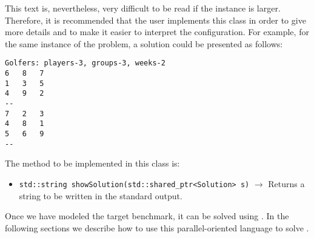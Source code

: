 This text is, nevertheless, very difficult to be read if the instance is larger. Therefore, it is recommended that the user implements this class in order to give more details and to make it easier to interpret the configuration. For example, for the same instance of the problem, a solution could be presented as follows:

\begin{Verbatim}
Golfers: players-3, groups-3, weeks-2
6	8	7	
1	3	5	
4	9	2	
--
7	2	3	
4	8	1	
5	6	9	
--
\end{Verbatim}

The method to be implemented in this class is:

\begin{itemize}
\item \verb!std::string showSolution(std::shared_ptr<Solution> s)! $\rightarrow$ Returns a string to be written in the standard output.
\end{itemize}

Once we have modeled the target benchmark, it can be solved using \posl{}. In the following sections we describe how to use this parallel-oriented language to solve \CSPs.